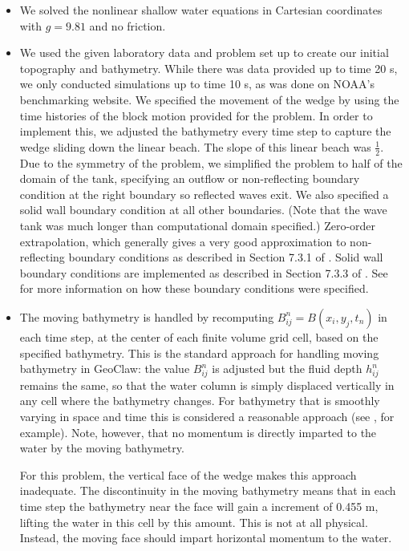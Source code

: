 \begin{itemize}
\item We solved the nonlinear shallow water equations in Cartesian
coordinates with $g=9.81$ and no friction.

\item We used the given laboratory data and problem set up to create our
initial topography and bathymetry.  While there was data provided up to
time 20 s, we only conducted simulations up to time 10 s, as was done on 
NOAA's benchmarking website.  We specified the movement of the wedge
by using the time histories of the block motion provided for the problem.  
In order to implement this, we adjusted the bathymetry every time step to
capture the wedge sliding down the linear beach.  The slope of this linear
beach was $\frac{1}{2}$.  Due to the symmetry of the problem, we simplified the
problem to half of the domain of the tank, specifying an outflow or non-reflecting
boundary condition at the right boundary so reflected waves exit.  We also
specified a solid wall boundary condition at all other boundaries.
(Note that the wave tank was much longer than computational domain specified.)
Zero-order extrapolation,
which generally gives a very good approximation to non-reflecting boundary
conditions as described in Section 7.3.1 of \cite{rjl:fvmhp}.  Solid wall
boundary conditions are implemented as described in Section 7.3.3 of
\cite{rjl:fvmhp}.  See  for more information on how these
boundary conditions were specified.


\item  The moving bathymetry is handled by recomputing $B_{ij}^n =
B(x_i,y_j,t_n)$ in
each time step, at the center of each finite volume grid cell, based on the
specified bathymetry.
This is the standard approach
for handling moving bathymetry in GeoClaw:  the value $B_{ij}^n$ is adjusted
but the fluid depth $h_{ij}^n$ remains the same, so that the water column is
simply displaced vertically in any cell where the bathymetry changes.  For
bathymetry that is smoothly varying  in space and time
this is considered a reasonable approach (see , for example).  
Note, however, that no momentum
is directly imparted to the water by the moving bathymetry.  

For this problem, the vertical face of the wedge makes this approach
inadequate.  The discontinuity in the moving bathymetry means that in each
time step the bathymetry near the face will gain a increment of 0.455 m,
lifting the water in this cell by this amount.  This is not at all physical.
Instead, the moving face should impart horizontal momentum to the water.


\end{itemize}
